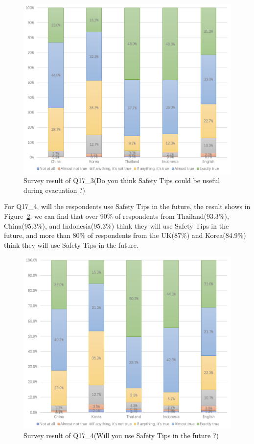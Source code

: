 \begin{figure}[h]
  \includegraphics[width=0.8\linewidth]{Figure/Figure17.jpg}
  \centering
  \caption[Survey result of Q17\_3]{Survey result of Q17\_3(Do you think Safety Tips could be useful during evacuation ?)}
  \label{fig17}
\end{figure}

For Q17\_4, will the respondents use Safety Tips in the future, the result shows in Figure~\ref{fig18}. we can find that over 90\% of respondents from Thailand(93.3\%), China(95.3\%), and Indonesia(95.3\%) think they will use Safety Tips in the future, and more than 80\% of respondents from the UK(87\%) and Korea(84.9\%) think they will use Safety Tips in the future.

\begin{figure}[h]
  \includegraphics[width=0.8\linewidth]{Figure/Figure18.jpg}
  \centering
  \caption[Survey result of Q17\_4]{Survey result of Q17\_4(Will you use Safety Tips in the future ?)}
  \label{fig18}
\end{figure}

